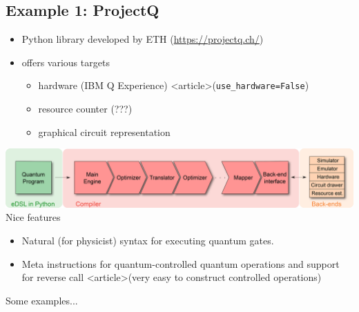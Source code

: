 \documentclass[a4paper,11pt]{article}
\begin{document}
\subsection{Example 1: ProjectQ}


\begin{itemize}
\item Python library developed by ETH (\url{https://projectq.ch/})
\item offers various targets
\begin{itemize}
\item hardware (IBM Q Experience) 
<article>{(\verb|use_hardware=False|)}
\item resource counter (???)
\item graphical circuit representation
\end{itemize}
\end{itemize}




\includegraphics[width=\textwidth]{../slides/pics/projectq-compiler-overview.png}\\




Nice features
\begin{itemize}
\item Natural (for physicist) syntax for executing quantum gates.
\item Meta instructions for quantum-controlled quantum operations and 
support for reverse call
<article>{(very easy to construct controlled operations)}
\end{itemize}



Some examples...


\end{document}
